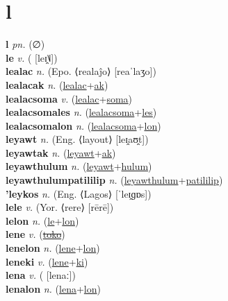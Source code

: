 \section{l}

\textbf{l} \textit{pn.} (∅)
 \label{l} \\
\textbf{le} \textit{v.} ( [leɪ̯˥˩])
 \label{le} \\
\textbf{lealac} \textit{n.} (Epo. ⟨realaĵo⟩ [reaˈlaʒo])
 \label{lealac} \\
\textbf{lealacak} \textit{n.} (\hyperref[lealac]{lealac}+\hyperref[ak]{ak})
 \label{lealacak} \\
\textbf{lealacsoma} \textit{v.} (\hyperref[lealac]{lealac}+\hyperref[soma]{soma})
 \label{lealacsoma} \\
\textbf{lealacsomales} \textit{n.} (\hyperref[lealacsoma]{lealacsoma}+\hyperref[les]{les})
 \label{lealacsomales} \\
\textbf{lealacsomalon} \textit{n.} (\hyperref[lealacsoma]{lealacsoma}+\hyperref[lon]{lon})
 \label{lealacsomalon} \\
\textbf{leyawt} \textit{n.} (Eng. ⟨layout⟩ [leɪ̯aʊ̯t])
 \label{leyawt} \\
\textbf{leyawtak} \textit{n.} (\hyperref[leyawt]{leyawt}+\hyperref[ak]{ak})
 \label{leyawtak} \\
\textbf{leyawthulum} \textit{n.} (\hyperref[leyawt]{leyawt}+\hyperref[hulum]{hulum})
 \label{leyawthulum} \\
\textbf{leyawthulumpatililip} \textit{n.} (\hyperref[leyawthulum]{leyawthulum}+\hyperref[patililip]{patililip})
 \label{leyawthulumpatililip} \\
\textbf{'leykos} \textit{n.} (Eng. ⟨Lagos⟩ [ˈleɪ̯ɡɒs])
 \label{'leykos} \\
\textbf{lele} \textit{v.} (Yor. ⟨rere⟩ [rērē])
 \label{lele} \\
\textbf{lelon} \textit{n.} (\hyperref[le]{le}+\hyperref[lon]{lon})
 \label{lelon} \\
\textbf{lene} \textit{v.} (\hyperref[toko]{\sout{toko}})
 \label{lene} \\
\textbf{lenelon} \textit{n.} (\hyperref[lene]{lene}+\hyperref[lon]{lon})
 \label{lenelon} \\
\textbf{leneki} \textit{v.} (\hyperref[lene]{lene}+\hyperref[ki]{ki})
 \label{leneki} \\
\textbf{lena} \textit{v.} ( [lenaː])
 \label{lena} \\
\textbf{lenalon} \textit{n.} (\hyperref[lena]{lena}+\hyperref[lon]{lon})
